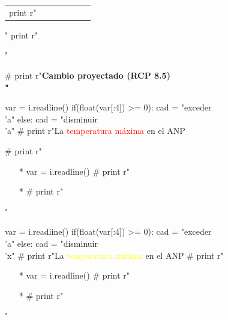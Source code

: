 \documentclass{article}
\begin{document}
\begin{python}
{\begin{table}[ht!]
\begin{tabular}{lcccccc}
		      print r"& \multicolumn{1}{l}{} & \multicolumn{1}{l}{} & \multicolumn{1}{l}{} & \multicolumn{1}{l}{} & \multicolumn{1}{l}{} & \multicolumn{1}{l}{}"
		      print r"\end{tabular}"
		      print r"\end{table}"






		      # print r"\bf{Cambio proyectado (RCP 8.5)\\}"
		      
		      var = i.readline()
		      if(float(var[:4]) >= 0):
		         cad = "exceder\\'a"
		      else:
		         cad = "disminuir\\'a"
		      # print r"La \textcolor{red}{temperatura m\'axima} en el ANP %
		      
		      # print r"\begin{itemize}"
		      # print r"\setlength\itemsep{1em}"
		      # print r"\item[*] %
		      var = i.readline()
		      # print r"\item[*] %
		      # print r"\end{itemize}"

		      var = i.readline()
		      if(float(var[:4]) >= 0):
		         cad = "exceder\\'a"
		      else:
		         cad = "disminuir\\'x"
		      # print r"La \textcolor{yellow}{temperatura m\'inima} en el ANP %
		      # print r"\begin{itemize}"
		      # print r"\setlength\itemsep{0em}"
		      # print r"\item[*] %
		      var = i.readline()
		      # print r"\item[*] %
		      # print r"\end{itemize}"

}
\end{python}
\end{document}
